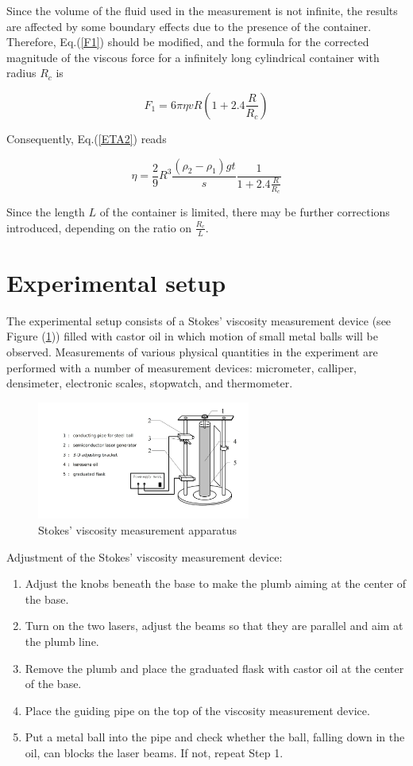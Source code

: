 \documentclass{article}
\begin{document}
Since the volume of the fluid used in the measurement is not infinite, the results are affected by some boundary effects due to the presence of the container. Therefore, Eq.(\ref{F1}) should be modified, and the formula for the corrected magnitude of the viscous force for a infinitely long cylindrical container with radius $R_c$ is

$$F_1=6\pi\eta vR\left(1+2.4\frac{R}{R_c}\right)$$

Consequently, Eq.(\ref{ETA2}) reads

\begin{equation}\label{ETA3}
\eta=\frac{2}{9}R^3\frac{(\rho_2-\rho_1)gt}{s}\frac{1}{1+2.4\frac{R}{R_c}}
\end{equation}

Since the length $L$ of the container is limited, there may be further corrections introduced, depending on the ratio on $\frac{R_c}{L}$.

\section{Experimental setup}

The experimental setup consists of a Stokes’ viscosity measurement device (see Figure (\ref{fig-setup})) filled with castor oil in which motion of small metal balls will be observed. Measurements of various physical quantities in the experiment are performed with a number of measurement devices: micrometer, calliper, densimeter, electronic scales, stopwatch, and thermometer.

\begin{figure}[h!]
	\centering
	\includegraphics[width=7cm]{fig_setup.png}
	\caption{Stokes’ viscosity measurement apparatus}
	\label{fig-setup}
\end{figure}

Adjustment of the Stokes’ viscosity measurement device:
\begin{enumerate}[(1)]
	\item
	Adjust the knobs beneath the base to make the plumb aiming at the center of the base.
	\item
	Turn on the two lasers, adjust the beams so that they are parallel and aim at the plumb line.
	\item
	Remove the plumb and place the graduated flask with castor oil at the center of the base.
	\item
	Place the guiding pipe on the top of the viscosity measurement device.
	\item
	Put a metal ball into the pipe and check whether the ball, falling down in the oil, can blocks the laser beams.  If not, repeat Step 1.
\end{enumerate}
\end{document}

